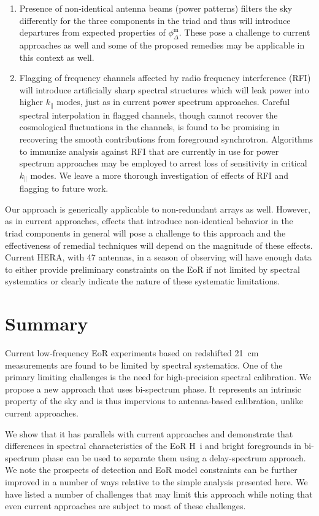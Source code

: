 \documentclass[
reprint,
superscriptaddress,
amsmath,
amssymb,
aps,
prd
]{revtex4-1}
\begin{document}
\begin{enumerate}
\item Presence of non-identical antenna beams (power patterns) filters the sky differently for the three components in the triad and thus will introduce departures from expected properties of $\phi_\Delta^\textrm{m}$. These pose a challenge to current approaches as well and some of the proposed remedies may be applicable in this context as well.
\item Flagging of frequency channels affected by radio frequency interference (RFI) will introduce artificially sharp spectral structures which will leak power into higher $k_\parallel$ modes, just as in current power spectrum approaches. Careful spectral interpolation in flagged channels, though cannot recover the cosmological fluctuations in the channels, is found to be promising in recovering the smooth contributions from foreground synchrotron. Algorithms to immunize analysis against RFI that are currently in use for power spectrum approaches may be employed to arrest loss of sensitivity in critical $k_\parallel$ modes. We leave a more thorough investigation of effects of RFI and flagging to future work.
\end{enumerate}

Our approach is generically applicable to non-redundant arrays as well. However, as in current approaches, effects that introduce non-identical behavior in the triad components in general will pose a challenge to this approach and the effectiveness of remedial techniques will depend on the magnitude of these effects. Current HERA, with 47 antennas, in a season of observing will have enough data to either provide preliminary constraints on the EoR if not limited by spectral systematics or clearly indicate the nature of these systematic limitations.

\section{Summary}\label{sec:summary}

Current low-frequency EoR experiments based on redshifted 21~cm measurements are found to be limited by spectral systematics. One of the primary limiting challenges is the need for high-precision spectral calibration. We propose a new approach that uses bi-spectrum phase. It represents an intrinsic property of the sky and is thus impervious to antenna-based calibration, unlike current approaches.
  
We show that it has parallels with current approaches and demonstrate that differences in spectral characteristics of the EoR H~{\sc i} and bright foregrounds in bi-spectrum phase can be used to separate them using a delay-spectrum approach. We note the prospects of detection and EoR model constraints can be further improved in a number of ways relative to the simple analysis presented here. We have listed a number of challenges that may limit this approach while noting that even current approaches are subject to most of these challenges.
  
\end{document}
